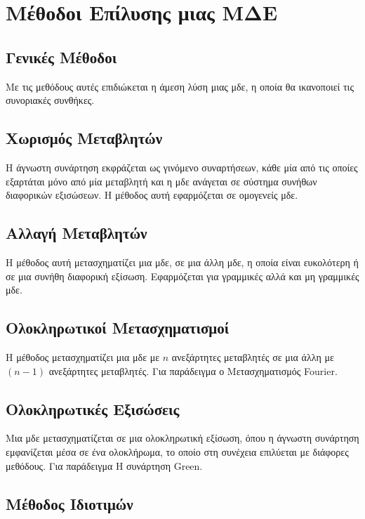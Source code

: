 \section*{Μέθοδοι Επίλυσης μιας ΜΔΕ}

\subsection*{Γενικές Μέθοδοι}

Με τις μεθόδους αυτές επιδιώκεται η άμεση λύση μιας μδε, 
η οποία θα ικανοποιεί τις συνοριακές συνθήκες.

\subsection*{Χωρισμός Μεταβλητών}

Η άγνωστη συνάρτηση εκφράζεται ως γινόμενο συναρτήσεων, 
κάθε μία από τις οποίες εξαρτάται μόνο από μία μεταβλητή και η μδε ανάγεται σε 
σύστημα συνήθων διαφορικών εξισώσεων. Η μέθοδος αυτή εφαρμόζεται σε ομογενείς μδε.


\subsection*{Αλλαγή Μεταβλητών} 

Η μέθοδος αυτή μετασχηματίζει μια μδε, σε μια άλλη μδε, η 
οποία είναι ευκολότερη ή σε μια συνήθη διαφορική εξίσωση. Εφαρμόζεται για γραμμικές
αλλά και μη γραμμικές μδε.

\subsection*{Ολοκληρωτικοί Μετασχηματισμοί} 

Η μέθοδος μετασχηματίζει μια μδε με $n$
ανεξάρτητες μεταβλητές σε μια άλλη με $ (n-1) $ ανεξάρτητες μεταβλητές. Για 
παράδειγμα ο Μετασχηματισμός Fourier.

\subsection*{Ολοκληρωτικές Εξισώσεις} 

Μια μδε μετασχηματίζεται σε μια ολοκληρωτική εξίσωση, 
όπου η άγνωστη συνάρτηση εμφανίζεται μέσα σε ένα ολοκλήρωμα, το οποίο στη συνέχεια 
επιλύεται με διάφορες μεθόδους. Για παράδειγμα Η συνάρτηση Green.

\subsection*{Μέθοδος Ιδιοτιμών} 

